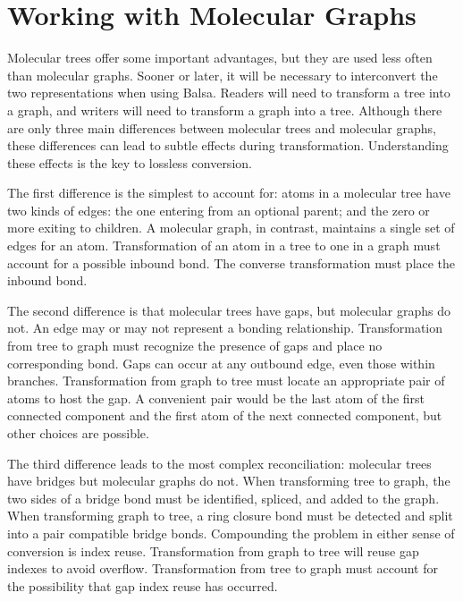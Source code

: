 \documentclass{article}
\begin{document}
\section*{Working with Molecular Graphs}
\label{working-with-molecular-graphs}

Molecular trees offer some important advantages, but they are used less often than molecular graphs. Sooner or later, it will be necessary to interconvert the two representations when using Balsa. Readers will need to transform a tree into a graph, and writers will need to transform a graph into a tree. Although there are only three main differences between molecular trees and molecular graphs, these differences can lead to subtle effects during transformation. Understanding these effects is the key to lossless conversion.

The first difference is the simplest to account for: atoms in a molecular tree have two kinds of edges: the one entering from an optional parent; and the zero or more exiting to children. A molecular graph, in contrast, maintains a single set of edges for an atom. Transformation of an atom in a tree to one in a graph must account for a possible inbound bond. The converse transformation must place the inbound bond.

The second difference is that molecular trees have gaps, but molecular graphs do not. An edge may or may not represent a bonding relationship. Transformation from tree to graph must recognize the presence of gaps and place no corresponding bond. Gaps can occur at any outbound edge, even those within branches. Transformation from graph to tree must locate an appropriate pair of atoms to host the gap. A convenient pair would be the last atom of the first connected component and the first atom of the next connected component, but other choices are possible.

The third difference leads to the most complex reconciliation: molecular trees have bridges but molecular graphs do not. When transforming tree to graph, the two sides of a bridge bond must be identified, spliced, and added to the graph. When transforming graph to tree, a ring closure bond must be detected and split into a pair compatible bridge bonds. Compounding the problem in either sense of conversion is index reuse. Transformation from graph to tree will reuse gap indexes to avoid overflow. Transformation from tree to graph must account for the possibility that gap index reuse has occurred.
\end{document}
